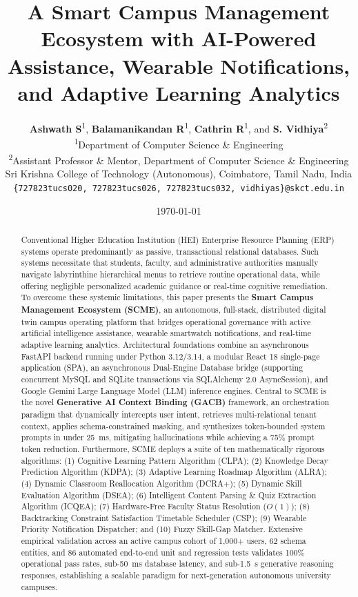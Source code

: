\documentclass[11pt,a4paper]{article}
\title{\textbf{\Large A Smart Campus Management Ecosystem with AI-Powered Assistance, Wearable Notifications, and Adaptive Learning Analytics}}
\author{
    \textbf{Ashwath S}\textsuperscript{1}, 
    \textbf{Balamanikandan R}\textsuperscript{1}, 
    \textbf{Cathrin R}\textsuperscript{1}, and 
    \textbf{S. Vidhiya}\textsuperscript{2}\\[1ex]
    \textsuperscript{1}Department of Computer Science \& Engineering\\
    \textsuperscript{2}Assistant Professor \& Mentor, Department of Computer Science \& Engineering\\
    Sri Krishna College of Technology (Autonomous), Coimbatore, Tamil Nadu, India\\
    \texttt{\{727823tucs020, 727823tucs026, 727823tucs032, vidhiyas\}@skct.edu.in}
}
\date{\today}
\begin{document}
\maketitle

\begin{abstract}
Conventional Higher Education Institution (HEI) Enterprise Resource Planning (ERP) systems operate predominantly as passive, transactional relational databases. Such systems necessitate that students, faculty, and administrative authorities manually navigate labyrinthine hierarchical menus to retrieve routine operational data, while offering negligible personalized academic guidance or real-time cognitive remediation. To overcome these systemic limitations, this paper presents the \textbf{Smart Campus Management Ecosystem (SCME)}, an autonomous, full-stack, distributed digital twin campus operating platform that bridges operational governance with active artificial intelligence assistance, wearable smartwatch notifications, and real-time adaptive learning analytics. Architectural foundations combine an asynchronous FastAPI backend running under Python 3.12/3.14, a modular React 18 single-page application (SPA), an asynchronous Dual-Engine Database bridge (supporting concurrent MySQL and SQLite transactions via SQLAlchemy 2.0 AsyncSession), and Google Gemini Large Language Model (LLM) inference engines. Central to SCME is the novel \textbf{Generative AI Context Binding (GACB)} framework, an orchestration paradigm that dynamically intercepts user intent, retrieves multi-relational tenant context, applies schema-constrained masking, and synthesizes token-bounded system prompts in under 25~ms, mitigating hallucinations while achieving a 75\% prompt token reduction. Furthermore, SCME deploys a suite of ten mathematically rigorous algorithms: (1) Cognitive Learning Pattern Algorithm (CLPA); (2) Knowledge Decay Prediction Algorithm (KDPA); (3) Adaptive Learning Roadmap Algorithm (ALRA); (4) Dynamic Classroom Reallocation Algorithm (DCRA+); (5) Dynamic Skill Evaluation Algorithm (DSEA); (6) Intelligent Content Parsing \& Quiz Extraction Algorithm (ICQEA); (7) Hardware-Free Faculty Status Resolution ($O(1)$); (8) Backtracking Constraint Satisfaction Timetable Scheduler (CSP); (9) Wearable Priority Notification Dispatcher; and (10) Fuzzy Skill-Gap Matcher. Extensive empirical validation across an active campus cohort of 1,000+ users, 62 schema entities, and 86 automated end-to-end unit and regression tests validates 100\% operational pass rates, sub-50~ms database latency, and sub-1.5~s generative reasoning responses, establishing a scalable paradigm for next-generation autonomous university campuses.
\end{abstract}
\end{document}
